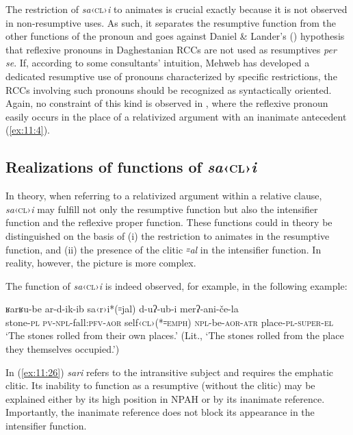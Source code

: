 ﻿\documentclass[output=paper]{langsci/langscibook}
\begin{document}
The restriction of \emph{sa}‹\textsc{cl}›\emph{i} to animates is crucial
exactly because it is not observed in non-resumptive uses. As such, it
separates the resumptive function from the other functions of the
pronoun and goes against Daniel \& Lander's (\citeyear{daniel-lander2008}) hypothesis that
reflexive pronouns in Daghestanian RCCs are not used as resumptives \emph{per se}.
If, according to some consultants' intuition, Mehweb has developed a
dedicated resumptive use of pronouns characterized by specific
restrictions, the RCCs involving such pronouns should be recognized as
syntactically oriented. Again, no constraint of this kind is observed in
, where the reflexive pronoun easily occurs in the place of
a relativized argument with an inanimate antecedent (\ref{ex:11:4}).


\subsection{Realizations of functions of
\emph{sa}‹\textsc{cl}›\emph{i}}

In theory, when referring to a relativized argument within a relative
clause, \emph{sa}‹\textsc{cl}›\emph{i} may fulfill not only the
resumptive function but also the intensifier function and the reflexive
proper function. These functions could in theory be distinguished on the
basis of (i) the restriction to animates in the resumptive function, and
(ii) the presence of the clitic \emph{꞊al} in the intensifier function.
In reality, however, the picture is more complex.

The  function of \emph{sa}‹\textsc{cl}›\emph{i} is indeed
observed, for example, in the following example:

\pagebreak

\ea \label{ex:11:26} %
\gll  ʁarʁu-be ar-d-ik-ib sa‹r›i*(꞊jal) d-uʔ-ub-i   merʔ-ani-če-la\\
  stone-\textsc{pl} \textsc{pv}-\textsc{npl}-fall:\textsc{pfv}-\textsc{aor}   self‹\textsc{cl}›(*꞊\textsc{emph}) \textsc{npl}-be-\textsc{aor}-\textsc{atr}  place-\textsc{pl}-\textsc{super}-\textsc{el}\\
\glt 
  `The stones rolled from their own places.'
  (Lit., `The stones rolled from the place they themselves occupied.')
\z

In (\ref{ex:11:26}) \emph{sari} refers to the intransitive subject and requires the
emphatic clitic. Its inability to function as a resumptive (without the
clitic) may be explained either by its high position in NPAH or by its
inanimate reference. Importantly, the inanimate reference does not block
its appearance in the intensifier function.
\end{document}
